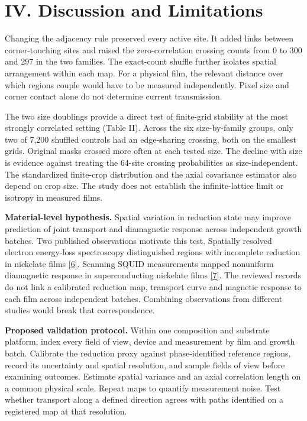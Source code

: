 \documentclass[11pt]{article}
\begin{document}
\section*{IV. Discussion and Limitations}

Changing the adjacency rule preserved every active site. It added links between corner-touching sites and raised the zero-correlation crossing counts from 0 to 300 and 297 in the two families. The exact-count shuffle further isolates spatial arrangement within each map. For a physical film, the relevant distance over which regions couple would have to be measured independently. Pixel size and corner contact alone do not determine current transmission.

The two size doublings provide a direct test of finite-grid stability at the most strongly correlated setting (Table II). Across the six size-by-family groups, only two of 7,200 shuffled controls had an edge-sharing crossing, both on the smallest grids. Original masks crossed more often at each tested size. The decline with size is evidence against treating the 64-site crossing probabilities as size-independent. The standardized finite-crop distribution and the axial covariance estimator also depend on crop size. The study does not establish the infinite-lattice limit or isotropy in measured films.

\textbf{Material-level hypothesis.} Spatial variation in reduction state may improve prediction of joint transport and diamagnetic response across independent growth batches. Two published observations motivate this test. Spatially resolved electron energy-loss spectroscopy distinguished regions with incomplete reduction in nickelate films \href{https://pmc.ncbi.nlm.nih.gov/articles/PMC7812792/}{[6]}. Scanning SQUID measurements mapped nonuniform diamagnetic response in superconducting nickelate films \href{https://doi.org/10.1103/PhysRevMaterials.8.024802}{[7]}. The reviewed records do not link a calibrated reduction map, transport curve and magnetic response to each film across independent batches. Combining observations from different studies would break that correspondence.

\textbf{Proposed validation protocol.} Within one composition and substrate platform, index every field of view, device and measurement by film and growth batch. Calibrate the reduction proxy against phase-identified reference regions, record its uncertainty and spatial resolution, and sample fields of view before examining outcomes. Estimate spatial variance and an axial correlation length on a common physical scale. Repeat maps to quantify measurement noise. Test whether transport along a defined direction agrees with paths identified on a registered map at that resolution.
\end{document}
